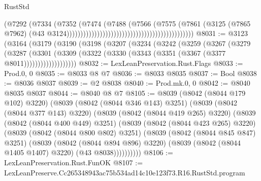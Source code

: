 \begin{lexlean}{RustStd}
\begin{coremodule}
                                                                            (@7292
                                                                              (@7334
                                                                                (@7352
                                                                                  (@7474
                                                                                    (@7488
                                                                                      (@7566
                                                                                        (@7575
                                                                                          (@7861
                                                                                            (@3125
                                                                                              (@7865
                                                                                                @7962)
                                                                                              (@43
                                                                                                @3124))))))))))))))))))))))))))))))))))))))))))))))
@8031 := @3123
    (@3164
      (@3179
        (@3190
          (@3198
            (@3207
              (@3234
                (@3242
                  (@3259
                    (@3267
                      (@3279
                        (@3287
                          (@3301
                            (@3309
                              (@3322 (@3330 (@3343 (@3351 (@3367 (@3377 @8011)))))))))))))))))))
@8032 := LexLeanPreservation.Rust.Flags
@8033 := Prod.{0, 0}
@8035 := @8033 @8 @7
@8036 := @8033 @8035
@8037 := Bool
@8038 := @8036 @8037
@8039 := @2 @8038
@8040 := Prod.mk.{0, 0}
@8042 := @8040 @8035 @8037
@8044 := @8040 @8 @7
@8105 := @8039
    (@8042 (@8044 @179 @102) @3220)
    (@8039
      (@8042 (@8044 @346 @143) @3251)
      (@8039
        (@8042 (@8044 @377 @143) @3220)
        (@8039
          (@8042 (@8044 @419 @265) @3220)
          (@8039
            (@8042 (@8044 @400 @449) @3251)
            (@8039
              (@8042 (@8044 @423 @265) @3220)
              (@8039
                (@8042 (@8044 @800 @802) @3251)
                (@8039
                  (@8042 (@8044 @845 @847) @3251)
                  (@8039
                    (@8042 (@8044 @894 @896) @3220)
                    (@8039 (@8042 (@8044 @1405 @1407) @3220) (@43 @8038))))))))))
@8106 := LexLeanPreservation.Rust.FunOK
@8107 := LexLeanPreserve.Cc265348943ac75b534ad14c10e123f73.R16.RustStd.program

\end{coremodule}
\end{lexlean}
